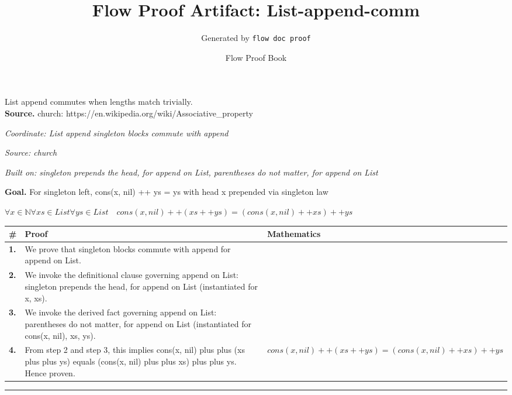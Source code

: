 \documentclass[11pt]{article}
\title{Flow Proof Artifact: List-append-comm}
\author{Generated by \texttt{flow doc proof}}
\date{Flow Proof Book}
\theoremstyle{definition}
\begin{document}
\maketitle
List append commutes when lengths match trivially.\\[0.5em]
\textbf{Source.} church: https://en.wikipedia.org/wiki/Associative\_property\\[0.5em]
\bigskip
{}\par
\smallskip\noindent\textit{Coordinate: List \cdot append \cdot singleton blocks commute with append}\par
\smallskip\noindent\textit{Source: church}\par
\smallskip\noindent\textit{Built on: singleton prepends the head, for append on List, parentheses do not matter, for append on List}\par
\medskip
\noindent\textbf{Goal.} For singleton left, cons(x, nil) ++ ys = ys with head x prepended via singleton law\par
\noindent$\displaystyle \forall x \in \mathbb{N} \forall xs \in List \forall ys \in List\quad cons(x, nil) ++ (xs ++ ys) = (cons(x, nil) ++ xs) ++ ys$\par
\medskip
\noindent
\begin{tabular}{@{} >{\raggedright\arraybackslash}p{} >{\raggedright\arraybackslash}p{} >{\raggedleft\arraybackslash}p{} @{}}
\textbf{\#} & \textbf{Proof} & \textbf{Mathematics} \\
\midrule
\textbf{1.} & We prove that singleton blocks commute with append for append on List. & \\[0.45em]
\textbf{2.} & We invoke the definitional clause governing append on List: singleton prepends the head, for append on List (instantiated for x, xs). & \\[0.45em]
\textbf{3.} & We invoke the derived fact governing append on List: parentheses do not matter, for append on List (instantiated for cons(x, nil), xs, ys). & \\[0.45em]
\textbf{4.} & From step 2 and step 3, this implies cons(x, nil) plus plus (xs plus plus ys) equals (cons(x, nil) plus plus xs) plus plus ys. Hence proven. & $\displaystyle cons(x, nil) ++ (xs ++ ys) = (cons(x, nil) ++ xs) ++ ys$ \\[0.45em]
\bottomrule
\end{tabular}
\label{thm:List-append-singleton_blocks_commute_with_append}
\par\medskip\hrule
\end{document}
